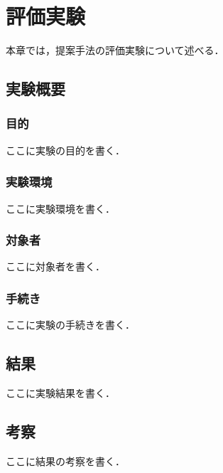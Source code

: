 \chapter{評価実験}\label{chap:evaluation}
本章では，提案手法の評価実験について述べる．

\section{実験概要}
\subsection{目的}
ここに実験の目的を書く．

\subsection{実験環境}
ここに実験環境を書く．

\subsection{対象者}
ここに対象者を書く．

\subsection{手続き}
ここに実験の手続きを書く．

\section{結果}
ここに実験結果を書く．

\section{考察}
ここに結果の考察を書く．
